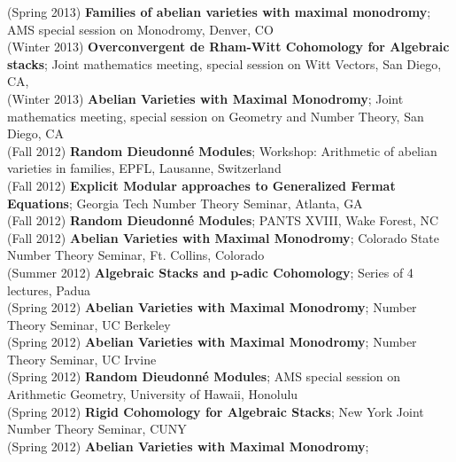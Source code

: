 \documentclass[margin,line]{res}
\begin{document}
\begin{resume}
(Spring 2013) \textbf{Families of abelian varieties with maximal monodromy};
AMS special session on Monodromy, 
Denver, CO
\vspace{.05cm}\\
(Winter 2013) \textbf{Overconvergent de Rham-Witt Cohomology for Algebraic stacks};
Joint mathematics meeting, special session on Witt Vectors, San Diego, CA, 
\vspace{.05cm}\\
(Winter 2013) \textbf{Abelian Varieties with Maximal Monodromy};
Joint mathematics meeting, special session on Geometry and Number Theory, San Diego, CA
\vspace{.05cm}\\
(Fall 2012) \textbf{Random Dieudonn\'e Modules};
Workshop: Arithmetic of abelian varieties in families, EPFL, Lausanne, Switzerland 
\vspace{.05cm}\\
(Fall 2012) \textbf{Explicit Modular approaches to Generalized Fermat Equations};
Georgia Tech Number Theory Seminar, Atlanta, GA 
\vspace{.05cm}\\
(Fall 2012) \textbf{Random Dieudonn\'e Modules};
PANTS XVIII, Wake Forest, NC 
\vspace{.05cm}\\
(Fall 2012) \textbf{Abelian Varieties with Maximal Monodromy};
Colorado State Number Theory Seminar, Ft. Collins, Colorado 
\vspace{.05cm}\\
(Summer 2012) \textbf{Algebraic Stacks and p-adic Cohomology};
Series of 4 lectures, Padua
\vspace{.05cm}\\
(Spring 2012) \textbf{Abelian Varieties with Maximal Monodromy};
Number Theory Seminar, UC Berkeley
\vspace{.05cm}\\
(Spring 2012) \textbf{Abelian Varieties with Maximal Monodromy};
Number Theory Seminar, UC Irvine
\vspace{.05cm}\\
(Spring 2012) \textbf{Random Dieudonn\'e Modules};
AMS special session on Arithmetic Geometry, University of Hawaii, Honolulu 
\vspace{.05cm}\\
(Spring 2012) \textbf{Rigid Cohomology for Algebraic Stacks};
New York Joint Number Theory Seminar, CUNY
\vspace{.05cm}\\
(Spring 2012) \textbf{Abelian Varieties with Maximal Monodromy};

\end{resume}
\end{document}
